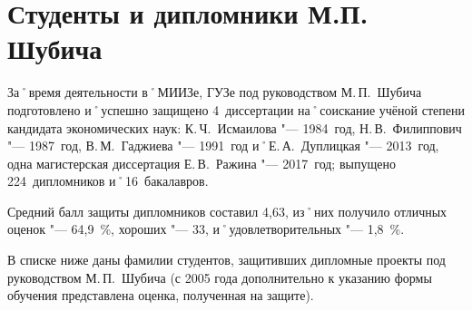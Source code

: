 ﻿\section{Студенты и дипломники М.П. Шубича}
За˚время деятельности в˚МИИЗе, ГУЗе под руководством М.\,П.~Шубича подготовлено и˚успешно защищено 4~диссертации на˚соискание учёной степени кандидата экономических наук: К.\,Ч.~Исмаилова "--- 1984~год, Н.\,В.~Филиппович "--- 1987~год, В.\,М.~Гаджиева "--- 1991~год и˚Е.\,А.~Дуплицкая "--- 2013~год, одна магистерская диссертация Е.\,В.~Ражина "--- 2017~год; выпущено 224~дипломников и˚16~бакалавров.

Средний балл защиты дипломников составил 4,63, из˚них получило отличных оценок "--- 64,9~\%, хороших "--- 33, и˚удовлетворительных "--- 1,8~\%.

В списке ниже даны фамилии студентов, защитивших дипломные проекты под руководством М.\,П.~Шубича (с 2005 года дополнительно к указанию формы обучения представлена  оценка, полученная на защите).

